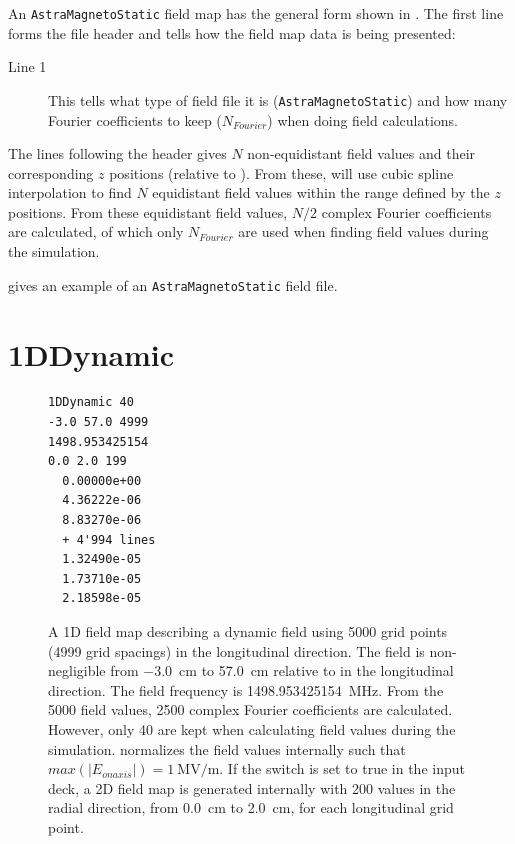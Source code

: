 An \texttt{AstraMagnetoStatic} field map has the general form shown in . The first line forms
the file header and tells \opalt how the field map data is being presented:

\begin{description}
\item[Line 1] This tells \opalt what type of field file it is (\texttt{AstraMagnetoStatic}) and how many Fourier coefficients to
  keep ($N_{Fourier}$) when doing field calculations.
\end{description}

The lines following the header gives $N$ non-equidistant field values and their corresponding $z$ positions (relative
to ). From these, \opalt will use cubic spline interpolation to find $N$ equidistant field values
within the range defined by the $z$ positions. From these equidistant field values, $N/2$ complex Fourier coefficients
are calculated, of which only $N_{Fourier}$ are used when finding field values during the simulation.

 gives an example of an \texttt{AstraMagnetoStatic} field file.

\clearpage

\section{1DDynamic}
\label{sec:1DDynamic}
\begin{figure}[h]
  \begin{fmpage}
\begin{verbatim}
1DDynamic 40
-3.0 57.0 4999
1498.953425154
0.0 2.0 199
  0.00000e+00
  4.36222e-06
  8.83270e-06
  + 4'994 lines
  1.32490e-05
  1.73710e-05
  2.18598e-05
\end{verbatim}
  \end{fmpage}
  \caption[Example of a 1DDynamic field map]{A 1D field map describing a dynamic field using 5000 grid points (4999 grid
    spacings) in the longitudinal direction. The field is non-negligible from \SI{-3.0}{\centi\meter} to \SI{57.0}{\centi\meter} relative to 
    in the longitudinal direction. The field frequency is \SI{1498.953425154}{\mega\hertz}. From the 5000 field values, 2500 complex
    Fourier coefficients are calculated. However, only 40 are kept when calculating field values during the simulation.
    \opalt normalizes the field values internally such that $max(|E_{on axis}|) = \SI{1}{\mega\volt/\meter}$. If the  switch is set to true
    in the input deck, a 2D field map is generated internally with 200 values in the radial direction, from \SI{0.0}{\centi\meter} to
    \SI{2.0}{\centi\meter}, for each longitudinal grid point.}
  \label{fig:1DDynamic}
\end{figure}

